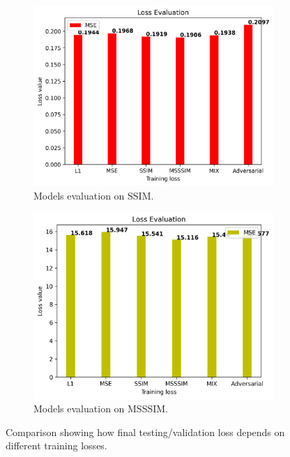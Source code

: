 \begin{figure}[H]
\begin{subfigure}[t]{0.45\textwidth}
    \includegraphics[width=\linewidth]{img/one-trial/model_loss_one_trial_ssim.png}
    \caption{Models evaluation on SSIM.}
  \end{subfigure}
  \begin{subfigure}[t]{0.45\textwidth}
    \centering
    \includegraphics[width=\linewidth]{img/one-trial/model_loss_one_trial_msssim.png}
    \caption{Models evaluation on MSSSIM.}
  \end{subfigure}
\caption{Comparison showing how final testing/validation loss depends on different training losses.}
\label{img:experiments:one-trial:finding-best-loss-bars}
\end{figure}

